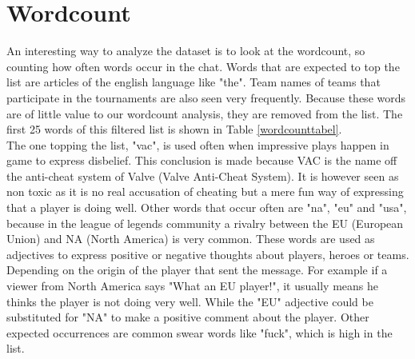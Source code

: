 \documentclass[final]{report}
\begin{document}
\noindent
\begin{minipage}{.5\textwidth}
  
\section{Wordcount}
An interesting way to analyze the dataset is to look at the wordcount, so counting how often words occur in the chat. Words that are expected to top the list are articles of the english language like "the". Team names of teams that participate in the tournaments are also seen very frequently. Because these words are of little value to our wordcount analysis, they are removed from the list. The first 25 words of this filtered list is shown in Table \ref{wordcounttabel}.\\
The one topping the list, "vac", is used often when impressive plays happen in game to express disbelief. This conclusion is made because VAC is the name off the anti-cheat system of Valve (Valve Anti-Cheat System). It is however seen as non toxic as it is no real accusation of cheating but a mere fun way of expressing that a player is doing well.
Other words that occur often are "na", "eu" and "usa", because in the league of legends community a rivalry between the EU (European Union) and NA (North America) is very common. These words are used as adjectives to express positive or negative thoughts about players, heroes or teams. Depending on the origin of the player that sent the message. For example if a viewer from North America says "What an EU player!", it usually means he thinks the player is not doing very well. While the "EU" adjective could be substituted for "NA" to make a positive comment about the player. Other expected occurrences are common swear words like "fuck", which is high in the list. \\


\end{minipage}%
\end{document}
